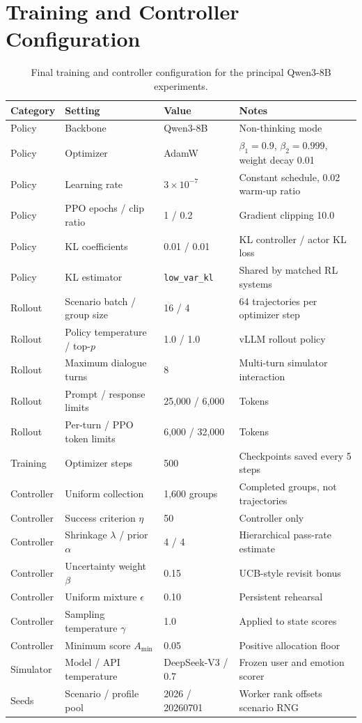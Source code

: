 \section{Training and Controller Configuration}
\begin{table}[t]
\centering
\small
\begin{tabular}{llll}
\toprule
Category & Setting & Value & Notes \\
\midrule
Policy & Backbone & Qwen3-8B & Non-thinking mode \\
Policy & Optimizer & AdamW & $\beta_1=0.9$, $\beta_2=0.999$, weight decay 0.01 \\
Policy & Learning rate & $3\times10^{-7}$ & Constant schedule, 0.02 warm-up ratio \\
Policy & PPO epochs / clip ratio & 1 / 0.2 & Gradient clipping 10.0 \\
Policy & KL coefficients & 0.01 / 0.01 & KL controller / actor KL loss \\
Policy & KL estimator & \texttt{low\_var\_kl} & Shared by matched RL systems \\
Rollout & Scenario batch / group size & 16 / 4 & 64 trajectories per optimizer step \\
Rollout & Policy temperature / top-$p$ & 1.0 / 1.0 & vLLM rollout policy \\
Rollout & Maximum dialogue turns & 8 & Multi-turn simulator interaction \\
Rollout & Prompt / response limits & 25,000 / 6,000 & Tokens \\
Rollout & Per-turn / PPO token limits & 6,000 / 32,000 & Tokens \\
Training & Optimizer steps & 500 & Checkpoints saved every 5 steps \\
Controller & Uniform collection & 1,600 groups & Completed groups, not trajectories \\
Controller & Success criterion $\eta$ & 50 & Controller only \\
Controller & Shrinkage $\lambda$ / prior $\alpha$ & 4 / 4 & Hierarchical pass-rate estimate \\
Controller & Uncertainty weight $\beta$ & 0.15 & UCB-style revisit bonus \\
Controller & Uniform mixture $\epsilon$ & 0.10 & Persistent rehearsal \\
Controller & Sampling temperature $\gamma$ & 1.0 & Applied to state scores \\
Controller & Minimum score $A_{\min}$ & 0.05 & Positive allocation floor \\
Simulator & Model / API temperature & DeepSeek-V3 / 0.7 & Frozen user and emotion scorer \\
Seeds & Scenario / profile pool & 2026 / 20260701 & Worker rank offsets scenario RNG \\
\bottomrule
\end{tabular}
\caption{Final training and controller configuration for the principal
Qwen3-8B experiments.}
\label{tab:supp-training-config}
\end{table}

